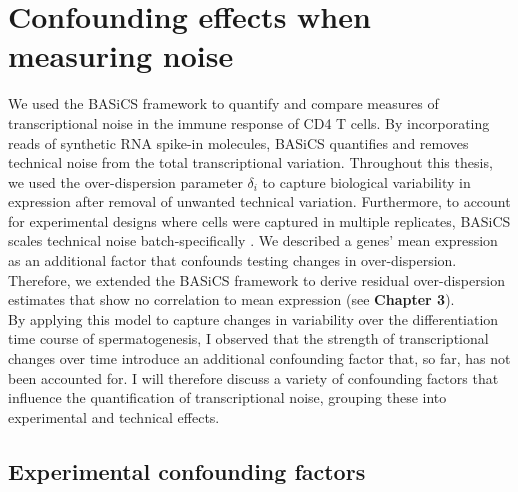 \newpage

\section{Confounding effects when measuring noise}

We used the BASiCS framework to quantify and compare measures of transcriptional noise in the immune response of CD4\plus{} T cells. 
By incorporating reads of synthetic RNA spike-in molecules, BASiCS quantifies and removes technical noise from the total transcriptional variation. 
Throughout this thesis, we used the over-dispersion parameter $\delta_i$ to capture biological variability in expression after removal of unwanted technical variation. 
Furthermore, to account for experimental designs where cells were captured in multiple replicates, BASiCS scales technical noise batch-specifically  \citep{Vallejos2015BASiCS}. 
We described a genes' mean expression as an additional factor that confounds testing changes in over-dispersion. 
Therefore, we extended the BASiCS framework to derive residual over-dispersion estimates that show no correlation to mean expression (see \textbf{Chapter 3}). \\

By applying this model to capture changes in variability over the differentiation time course of spermatogenesis, I observed that the strength of transcriptional changes over time introduce an additional confounding factor that, so far, has not been accounted for. 
I will therefore discuss a variety of confounding factors that influence the quantification of transcriptional noise, grouping these into experimental and technical effects.

\subsection{Experimental confounding factors}

